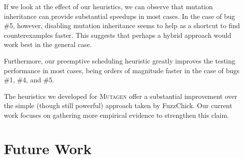\documentclass[10pt,conference]{IEEEtran}
\newcommand{\ourtool}{\textsc{Mutagen}\xspace}
\begin{document}
If we look at the effect of our heuristics, we can observe that mutation
inheritance can provide substantial speedups in most cases.
%
%
In the case of bug \#5, however, disabling mutation inheritance seems to
help as a shortcut to find counterexamples faster.
%
This suggests that perhaps a hybrid approach would work best in the general case.

Furthermore, our preemptive scheduling heuristic greatly improves the testing
performance in most cases, being orders of magnitude faster in the case of
bugs \#1, \#4, and \#5.


The heuristics we developed for \ourtool offer a substantial improvement over
the simple (though still powerful) approach taken by FuzzChick.
%
Our current work focuses on gathering more empirical evidence to strengthen this
claim.


\section{Future Work}



\end{document}

